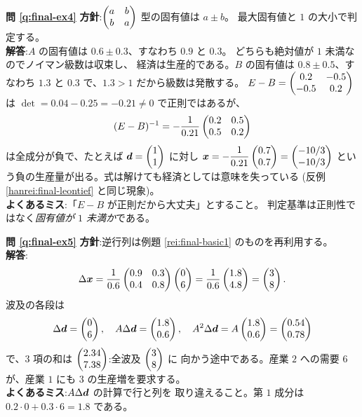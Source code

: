 \bigskip
\noindent\textbf{問 \ref{q:final-ex4}}\quad
\textbf{方針}:$\begin{pmatrix}a & b \\ b & a\end{pmatrix}$ 型の固有値は $a \pm b$。
最大固有値と $1$ の大小で判定する。\\
\textbf{解答}:$A$ の固有値は $0.6 \pm 0.3$、すなわち $0.9$ と $0.3$。
どちらも絶対値が $1$ 未満なのでノイマン級数は収束し、
経済は生産的である。$B$ の固有値は $0.8 \pm 0.5$、すなわち
$1.3$ と $0.3$ で、$1.3 > 1$ だから級数は発散する。
$E - B = \begin{pmatrix}0.2 & -0.5 \\ -0.5 & 0.2\end{pmatrix}$ は
$\det = 0.04 - 0.25 = -0.21 \neq 0$ で正則ではあるが、
\[
(E - B)^{-1} = -\frac{1}{0.21}\begin{pmatrix}0.2 & 0.5 \\ 0.5 & 0.2\end{pmatrix}
\]
は全成分が負で、たとえば $\bm{d} = \begin{pmatrix}1 \\ 1\end{pmatrix}$ に対し
$\bm{x} = -\dfrac{1}{0.21}\begin{pmatrix}0.7 \\ 0.7\end{pmatrix} = \begin{pmatrix}-10/3 \\ -10/3\end{pmatrix}$
という負の生産量が出る。式は解けても経済としては意味を失っている
(反例 \ref{hanrei:final-leontief} と同じ現象)。\\
\textbf{よくあるミス}:「$E - B$ が正則だから大丈夫」とすること。
判定基準は正則性ではなく\emph{固有値が $1$ 未満か}である。

\bigskip
\noindent\textbf{問 \ref{q:final-ex5}}\quad
\textbf{方針}:逆行列は例題 \ref{rei:final-basic1} のものを再利用する。\\
\textbf{解答}:
\[
\Delta\bm{x} = \frac{1}{0.6}\begin{pmatrix}0.9 & 0.3 \\ 0.4 & 0.8\end{pmatrix}\begin{pmatrix}0 \\ 6\end{pmatrix}
= \frac{1}{0.6}\begin{pmatrix}1.8 \\ 4.8\end{pmatrix} = \begin{pmatrix}3 \\ 8\end{pmatrix}.
\]
波及の各段は
\[
\Delta\bm{d} = \begin{pmatrix}0 \\ 6\end{pmatrix}, \quad
A\Delta\bm{d} = \begin{pmatrix}1.8 \\ 0.6\end{pmatrix}, \quad
A^2\Delta\bm{d} = A\begin{pmatrix}1.8 \\ 0.6\end{pmatrix} = \begin{pmatrix}0.54 \\ 0.78\end{pmatrix}
\]
で、$3$ 項の和は $\begin{pmatrix}2.34 \\ 7.38\end{pmatrix}$:全波及 $\begin{pmatrix}3 \\ 8\end{pmatrix}$ に
向かう途中である。産業 $2$ への需要 $6$ が、産業 $1$ にも
$3$ の生産増を要求する。\\
\textbf{よくあるミス}:$A\Delta\bm{d}$ の計算で行と列を
取り違えること。第 $1$ 成分は $0.2 \cdot 0 + 0.3 \cdot 6 = 1.8$ である。


